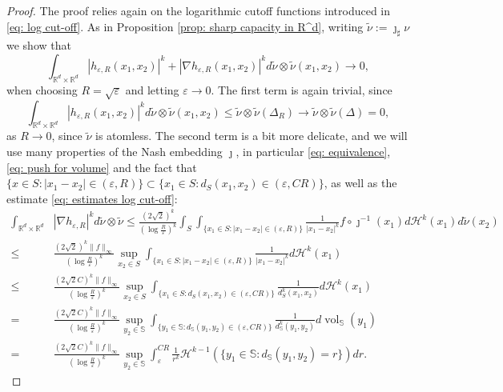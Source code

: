 \documentclass[10pt,leqno]{amsart}
\numberwithin{equation}{section}
\newcommand{\R}{\mathbb{R}}
\newcommand{\Ss}{\mathbb{S}}
\begin{document}
\begin{proof}
    The proof relies again on the logarithmic cutoff functions introduced in \eqref{eq: log cut-off}. As in Proposition \ref{prop: sharp capacity in R^d}, writing $\tilde{\nu}:= \jmath_\sharp\nu$ we show that 
    \[\int_{\R^d \times \R^d}|h_{\varepsilon,R}(x_1,x_2)|^k + |\nabla h_{\varepsilon,R}(x_1,x_2)|^k d\tilde{\nu}\otimes \tilde{\nu}(x_1,x_2) \to 0,\]
    when choosing $R=\sqrt{\varepsilon}$ and letting $\varepsilon\to 0$. The first term is again trivial, since 
    \[\int_{\R^d \times \R^d}|h_{\varepsilon,R}(x_1,x_2)|^k d\tilde{\nu}\otimes \tilde{\nu}(x_1,x_2) \leq \tilde{\nu}\otimes \tilde{\nu}(\Delta_R) \to \tilde{\nu}\otimes \tilde{\nu}(\Delta) =  0,\]
    as $R\to 0$, since $\tilde{\nu}$ is atomless. The second term is a bit more delicate, and we will use many properties of the Nash embedding $\jmath$, in particular \eqref{eq: equivalence}, \eqref{eq: push for volume} and the fact that $\{x\in S : |x_1-x_2|\in(\varepsilon,R)\}\subset \{x_1\in S : d_S(x_1,x_2) \in (\varepsilon,CR)\}$, as well as the estimate \eqref{eq: estimates log cut-off}:
    \begin{align*}
        \int_{\R^d \times \R^d} &|\nabla h_{\varepsilon,R}|^k d\tilde{\nu}\otimes \tilde{\nu} \leq \frac{(2\sqrt{2})^k}{\left( \log \frac{R}{\varepsilon} \right)^k} \int_S \int_{\{x_1\in S : |x_1-x_2|\in (\varepsilon,R)\}} \frac{1}{|x_1-x_2|^k} f\circ \jmath^{-1}(x_1) d\mathcal{H}^k(x_1) d\tilde\nu(x_2)
        \\
        \leq & 
        \frac{(2\sqrt{2})^k\|f\|_\infty}{\left( \log \frac{R}{\varepsilon} \right)^k} \sup_{x_2\in S} \int_{\{x_1\in S : |x_1-x_2|\in (\varepsilon,R)\}} \frac{1}{|x_1-x_2|^k} d\mathcal{H}^k(x_1)
        \\ 
        \leq & 
        \frac{(2\sqrt{2} C)^k\|f\|_\infty}{ \left( \log \frac{R}{\varepsilon} \right)^k} \sup_{x_2\in S} \int_{\{x_1\in S : d_S(x_1,x_2)\in (\varepsilon,CR)\}} \frac{1}{d_S^k(x_1,x_2)} d\mathcal{H}^k(x_1)
        \\
        = & 
        \frac{(2\sqrt{2}C)^k\|f\|_\infty}{ \left( \log \frac{R}{\varepsilon} \right)^k} \sup_{y_2\in \Ss} \int_{\{y_1\in \Ss : d_\Ss(y_1,y_2)\in (\varepsilon,CR)\}} \frac{1}{d_\Ss^k(y_1,y_2)} d\operatorname{vol}_\Ss(y_1)
        \\
        = &
        \frac{(2\sqrt{2}C)^k\|f\|_\infty}{ \left( \log \frac{R}{\varepsilon} \right)^k} \sup_{y_2\in \Ss} \int_\varepsilon^{CR}  \frac{1}{r^k} \mathcal{H}^{k-1}(\{y_1\in \Ss : d_\Ss(y_1,y_2) = r\}) dr.

\end{align*}
\end{proof}
\end{document}
